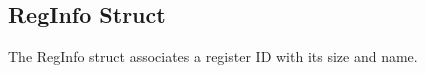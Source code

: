 \subsection{RegInfo Struct}
\label{structDyninst_1_1InstructionAPI_1_1RegInfo}


The RegInfo struct associates a register ID with its size and name.  


